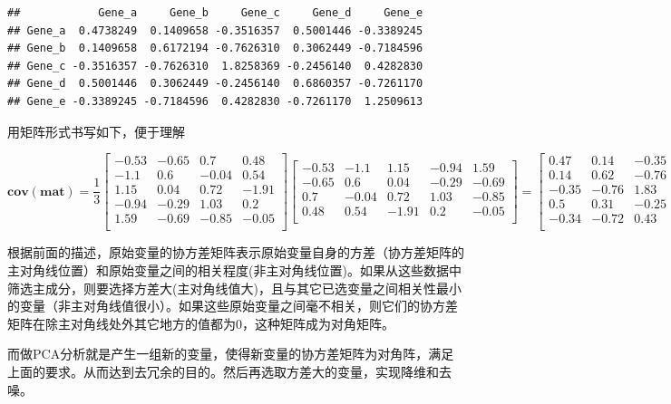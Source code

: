 \documentclass[]{article}
\numberwithin{figure}{section}
\numberwithin{table}{section}
\theoremstyle{definition}
\theoremstyle{definition}
\theoremstyle{definition}
\theoremstyle{remark}
\begin{document}
\begin{verbatim}
##            Gene_a     Gene_b     Gene_c     Gene_d     Gene_e
## Gene_a  0.4738249  0.1409658 -0.3516357  0.5001446 -0.3389245
## Gene_b  0.1409658  0.6172194 -0.7626310  0.3062449 -0.7184596
## Gene_c -0.3516357 -0.7626310  1.8258369 -0.2456140  0.4282830
## Gene_d  0.5001446  0.3062449 -0.2456140  0.6860357 -0.7261170
## Gene_e -0.3389245 -0.7184596  0.4282830 -0.7261170  1.2509613
\end{verbatim}

用矩阵形式书写如下，便于理解

\[
\mathbf{cov(mat)} = \frac{1}{3} \left[\begin{array} {rrrr} -0.53 & -0.65 & 0.7 & 0.48 \\
 -1.1 & 0.6 & -0.04 & 0.54 \\
 1.15 & 0.04 & 0.72 & -1.91 \\
 -0.94 & -0.29 & 1.03 & 0.2 \\
 1.59 & -0.69 & -0.85 & -0.05 \\
 \end{array}\right] \left[\begin{array} {rrrrr} -0.53 & -1.1 & 1.15 & -0.94 & 1.59 \\
 -0.65 & 0.6 & 0.04 & -0.29 & -0.69 \\
 0.7 & -0.04 & 0.72 & 1.03 & -0.85 \\
 0.48 & 0.54 & -1.91 & 0.2 & -0.05 \\
 \end{array}\right] = \left[\begin{array} {rrrrr} 0.47 & 0.14 & -0.35 & 0.5 & -0.34 \\
 0.14 & 0.62 & -0.76 & 0.31 & -0.72 \\
 -0.35 & -0.76 & 1.83 & -0.25 & 0.43 \\
 0.5 & 0.31 & -0.25 & 0.69 & -0.73 \\
 -0.34 & -0.72 & 0.43 & -0.73 & 1.25 \\
 \end{array}\right] 
\]

根据前面的描述，原始变量的协方差矩阵表示原始变量自身的方差（协方差矩阵的主对角线位置）和原始变量之间的相关程度(非主对角线位置)。如果从这些数据中筛选主成分，则要选择方差大(主对角线值大)，且与其它已选变量之间相关性最小的变量（非主对角线值很小）。如果这些原始变量之间毫不相关，则它们的协方差矩阵在除主对角线处外其它地方的值都为0，这种矩阵成为对角矩阵。

而做PCA分析就是产生一组新的变量，使得新变量的协方差矩阵为对角阵，满足上面的要求。从而达到去冗余的目的。然后再选取方差大的变量，实现降维和去噪。
\end{document}
